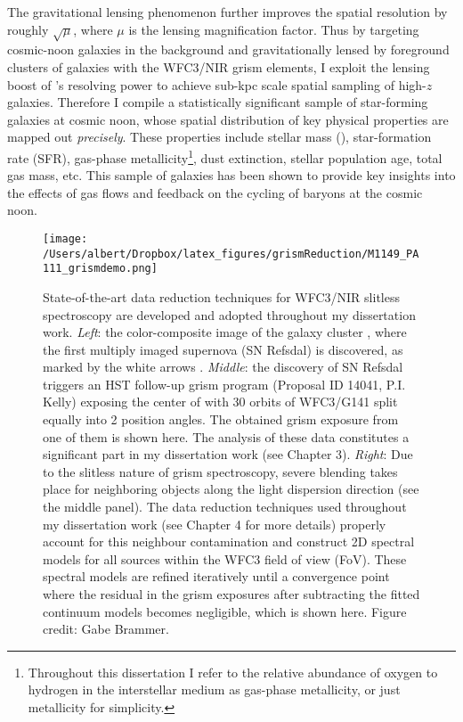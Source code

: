The gravitational lensing phenomenon further improves the spatial resolution by roughly $\sqrt{\mu}$,
where $\mu$ is the lensing magnification factor.
Thus by targeting cosmic-noon galaxies in the background and
gravitationally lensed by foreground clusters of galaxies with the \hst WFC3/NIR grism elements, I exploit the
lensing boost of \hst's resolving power to achieve sub-kpc scale spatial sampling of high-$z$ galaxies.
Therefore I compile a statistically significant sample of star-forming galaxies at cosmic noon,
whose spatial distribution of key physical properties are mapped out \emph{precisely}.
These properties include stellar mass (\Mstar), star-formation rate (SFR), gas-phase
metallicity\footnote{Throughout this dissertation I refer to the relative abundance of oxygen to hydrogen in the
interstellar medium as gas-phase metallicity, or just metallicity for simplicity.}, dust extinction, stellar
population age, total gas mass, etc.
This sample of galaxies has been shown to provide key insights into the effects of gas flows and feedback on the
cycling of baryons at the cosmic noon.

\begin{figure}
    \centering
    \texttt{[image: /Users/albert/Dropbox/latex\_figures/grismReduction/M1149\_PA111\_grismdemo.png]}
    \caption[State-of-the-art data reduction techniques for \hst WFC3/NIR slitless spectroscopy.]{
    State-of-the-art data reduction techniques for \hst WFC3/NIR slitless spectroscopy are developed and adopted 
    throughout my dissertation work.
    \textit{Left}: the color-composite image of the galaxy cluster \clyi, where the first multiply imaged
    supernova (\ie SN Refsdal) is discovered, as marked by the white arrows \citep{2015Sci...347.1123K}.
    \textit{Middle}: the discovery of SN Refsdal triggers an HST follow-up grism program (Proposal ID 14041, P.I.
    Kelly) exposing the center of \clyi with 30 orbits of WFC3/G141 split equally into 2 position angles.
    The obtained grism exposure from one of them is shown here.
    The analysis of these data constitutes a significant part in my dissertation work (see Chapter 3).
    \textit{Right}: Due to the slitless nature of \hst grism spectroscopy, severe blending takes place for
    neighboring objects along the light dispersion direction (see the middle panel).
    The data reduction techniques used throughout my dissertation work (see Chapter 4 for more details) 
    properly account for this neighbour contamination and construct 2D spectral models for all sources 
    within the WFC3 field of view (FoV).
    These spectral models are refined iteratively until a convergence point where the residual in the grism
    exposures after subtracting the fitted continuum models becomes negligible, which is shown here.
    Figure credit: Gabe Brammer.
    \label{fig:macs1149_grism}}
\end{figure}


